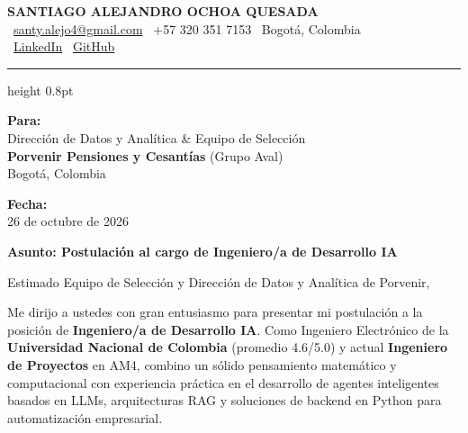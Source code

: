 \documentclass[11pt,a4paper]{article}
\begin{document}
\thispagestyle{empty}
\color{darktext}

\begin{center}
    {\Huge \bfseries\color{accent} SANTIAGO ALEJANDRO OCHOA QUESADA} \\[6pt]
    {\small\color{darktext}
    \faEnvelope\ \href{mailto:santy.alejo4@gmail.com}{santy.alejo4@gmail.com}
    \quad\textcolor{bulletline}{\textbar}\quad
    \faPhone\ +57 320 351 7153
    \quad\textcolor{bulletline}{\textbar}\quad
    \faMapMarker*\ Bogotá, Colombia \\[4pt]
    \faLinkedin\ \href{https://linkedin.com/in/santiago-alejandro-ochoa-quesada-a07a18288/}{LinkedIn}
    \quad\textcolor{bulletline}{\textbar}\quad
    \faGithub\ \href{https://github.com/Sochoaq}{GitHub}
    }
\end{center}
\vspace{2pt}
{\color{bulletline}\hrule height 0.8pt}
\vspace{10pt}

\noindent
\begin{minipage}[t]{0.62\textwidth}
    \textbf{\color{accent} Para:}\\
    Dirección de Datos y Analítica \& Equipo de Selección\\
    \textbf{Porvenir Pensiones y Cesantías} (Grupo Aval)\\
    Bogotá, Colombia
\end{minipage}
\hfill
\begin{minipage}[t]{0.35\textwidth}\raggedleft
    \textbf{\color{accent} Fecha:}\\
    26 de octubre de 2026
\end{minipage}

\vspace{6pt}
\noindent
{\large\bfseries\color{accent} Asunto: Postulación al cargo de Ingeniero/a de Desarrollo IA}
\vspace{2pt}

\noindent Estimado Equipo de Selección y Dirección de Datos y Analítica de Porvenir,

Me dirijo a ustedes con gran entusiasmo para presentar mi postulación a la posición de \textbf{Ingeniero/a de Desarrollo IA}. Como Ingeniero Electrónico de la \textbf{Universidad Nacional de Colombia} (promedio 4.6/5.0) y actual \textbf{Ingeniero de Proyectos} en AM4, combino un sólido pensamiento matemático y computacional con experiencia práctica en el desarrollo de agentes inteligentes basados en LLMs, arquitecturas RAG y soluciones de backend en Python para automatización empresarial.
\end{document}
